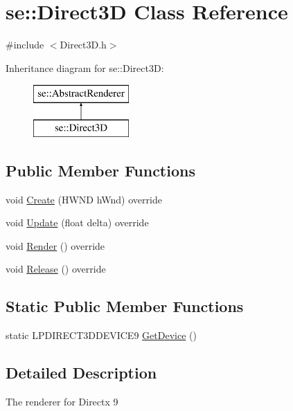 \hypertarget{classse_1_1_direct3_d}{}\section{se\+:\+:Direct3D Class Reference}
\label{classse_1_1_direct3_d}


{\ttfamily \#include $<$Direct3\+D.\+h$>$}

Inheritance diagram for se\+:\+:Direct3D\+:\begin{figure}[H]
\begin{center}
\leavevmode
\includegraphics[height=2.000000cm]{classse_1_1_direct3_d}
\end{center}
\end{figure}
\subsection*{Public Member Functions}
\begin{DoxyCompactItemize}
\item 
void \mbox{\hyperlink{classse_1_1_direct3_d_a316456762829db0614077cccd655e654}{Create}} (H\+W\+ND h\+Wnd) override
\item 
void \mbox{\hyperlink{classse_1_1_direct3_d_a39934c194406f108a992d82a4d265381}{Update}} (float delta) override
\item 
void \mbox{\hyperlink{classse_1_1_direct3_d_af4e167f88160d79fc66b4d65694b536a}{Render}} () override
\item 
void \mbox{\hyperlink{classse_1_1_direct3_d_ae2979f16a5c35773cf2c243d8e6f90e4}{Release}} () override
\end{DoxyCompactItemize}
\subsection*{Static Public Member Functions}
\begin{DoxyCompactItemize}
\item 
static L\+P\+D\+I\+R\+E\+C\+T3\+D\+D\+E\+V\+I\+C\+E9 \mbox{\hyperlink{classse_1_1_direct3_d_af37600089f9754a90e615210a6bee4f7}{Get\+Device}} ()
\end{DoxyCompactItemize}


\subsection{Detailed Description}
The renderer for Directx 9 


